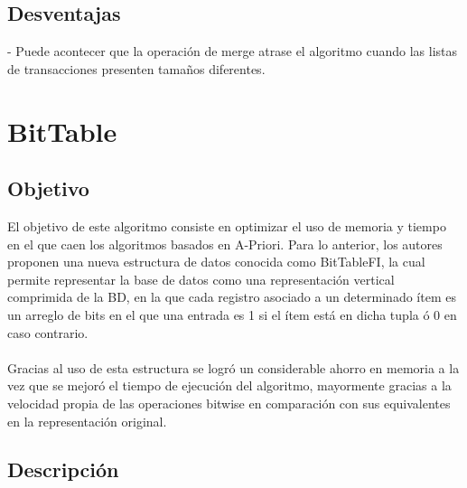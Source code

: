 \documentclass[12pt,spanish]{article}
\begin{document}
\subsection{Desventajas}

- Puede acontecer que la operación de merge atrase el algoritmo cuando las listas de transacciones presenten tamaños diferentes.

\section{BitTable}

\subsection{Objetivo}

El objetivo de este algoritmo consiste en optimizar el uso de memoria y tiempo en el que caen los algoritmos basados en A-Priori. Para lo anterior, los autores proponen una nueva estructura de datos conocida como BitTableFI, la cual permite representar la base de datos como una representación vertical comprimida de la BD, en la que cada registro asociado a un determinado ítem es un arreglo de bits en el que una entrada es 1 si el ítem está en dicha tupla ó 0 en caso contrario.
\\\\
Gracias al uso de esta estructura se logró un considerable ahorro en memoria a la vez que se mejoró el tiempo de ejecución del algoritmo, mayormente gracias a la velocidad propia de las operaciones bitwise en comparación con sus equivalentes en la representación original.

\subsection{Descripción}
\end{document}
